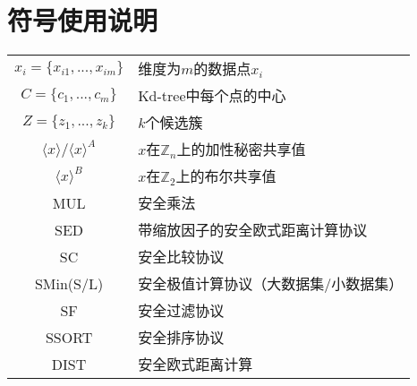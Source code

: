 \chapter*{符号使用说明}

\begin{denotation}

\item
%	
%
\begin{tabular}{cl}
	$ x_i =\{x_{i1},...,x_{im}\} $ & 维度为$ m $的数据点$ x_i $\\
	$ C = \{c_1,...,c_m\} $& Kd-tree中每个点的中心\\
	$ Z = \{z_1,...,z_k\} $& $ k $个候选簇\\
	$ \langle x \rangle/\langle x \rangle^A $& $ x $在$ \mathbb{Z}_n $上的加性秘密共享值\\
	$ \langle x \rangle^B $& $ x $在$ \mathbb{Z}_2 $上的布尔共享值\\
	MUL & 安全乘法\\
	SED & 带缩放因子的安全欧式距离计算协议\\
	SC & 安全比较协议\\
	SMin(S/L) & 安全极值计算协议（大数据集/小数据集）\\
	SF & 安全过滤协议\\
	SSORT & 安全排序协议\\
	DIST & 安全欧式距离计算\\
	
\end{tabular}	

\end{denotation}
